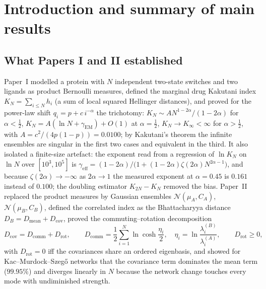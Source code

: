 \documentclass[11pt,reqno]{amsart}
\theoremstyle{plain}
\theoremstyle{definition}
\theoremstyle{remark}
\numberwithin{equation}{section}
\newcommand{\Dcov}{D_{\mathrm{cov}}}
\newcommand{\Dcomm}{D_{\mathrm{comm}}}
\newcommand{\Drot}{D_{\mathrm{rot}}}
\newcommand{\geff}{\gamma_{\mathrm{eff}}}
\newcommand{\CA}{C_A}
\newcommand{\CB}{C_B}
\newcommand{\gEM}{\gamma_{\mathrm{EM}}}
\begin{document}
\begin{abstract}
power laws, reproducing all $361$ measured values to $4\times10^{-4}$; the rotation-only singular phase is the iso-spectral signature of cryptic allostery. The paper closes with an assessment and with the empirical-covariance (Marchenko--Pastur) problem for the next step.
\end{abstract}

\maketitle
\tableofcontents

\section{Introduction and summary of main results}
\label{sec:intro}

\subsection*{What Papers I and II established}
Paper~I \cite{ChenChen2026I} modelled a protein with $N$ independent two-state switches and two ligands as product Bernoulli measures, defined the marginal drug Kakutani index $K_N=\sum_{i\le N}h_i$ (a sum of local squared Hellinger distances), and proved for the power-law shift $q_i=p+c\,i^{-\alpha}$ the trichotomy: $K_N\sim AN^{1-2\alpha}/(1-2\alpha)$ for $\alpha<\tfrac12$, $K_N=A(\ln N+\gEM)+O(1)$ at $\alpha=\tfrac12$, $K_N\to K_\infty<\infty$ for $\alpha>\tfrac12$, with $A=c^2/(4p(1-p))=0.0100$; by Kakutani's theorem \cite{Kakutani1948} the infinite ensembles are singular in the first two cases and equivalent in the third. It also isolated a finite-size artefact: the exponent read from a regression of $\ln K_N$ on $\ln N$ over $[10^3,10^5]$ is $\geff=(1-2\alpha)/\bigl(1+(1-2\alpha)\zeta(2\alpha)N^{2\alpha-1}\bigr)$, and because $\zeta(2\alpha)\to-\infty$ as $2\alpha\to1$ the measured exponent at $\alpha=0.45$ is $0.161$ instead of $0.100$; the doubling estimator $K_{2N}-K_N$ removed the bias. Paper~II \cite{ChenChen2026II} replaced the product measures by Gaussian ensembles $\mathcal N(\mu_A,\CA)$, $\mathcal N(\mu_B,\CB)$, defined the correlated index as the Bhattacharyya distance $D_B=D_{\mathrm{mean}}+\Dcov$, proved the commuting--rotation decomposition
\begin{equation}\label{eq:decomp}
\Dcov=\Dcomm+\Drot,\qquad \Dcomm=\frac12\sum_{i=1}^N\ln\cosh\frac{\eta_i}{2},\quad \eta_i=\ln\frac{\lambda^{(B)}_i}{\lambda^{(A)}_i},\qquad \Drot\ge0,
\end{equation}
with $\Drot=0$ iff the covariances share an ordered eigenbasis, and showed for Kac--Murdock--Szeg\H{o} networks that the covariance term dominates the mean term ($99.95\%$) and diverges linearly in $N$ because the network change touches every mode with undiminished strength.
\end{document}
